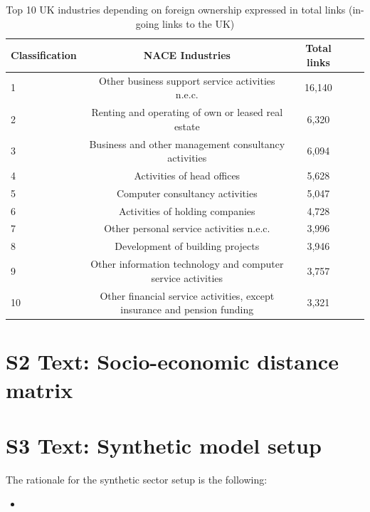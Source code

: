\documentclass[10pt,letterpaper]{article}
\begin{document}
\begin{table}[!ht]
\begin{adjustwidth}{-2.25in}{0in}
\caption{Top 10 UK industries depending on foreign ownership expressed in total links (in-going links to the UK)\label{tab:uk_ingoinglinks}}
\centering
\medskip
\begin{tabular}{|l|c|c|c|c|}
\hline
Classification  & NACE Industries & Total links \\ 
\hline
1 &      Other business support service activities n.e.c. &   16,140  \\
\hline
2 & Renting and operating of own or leased real estate  &  6,320  \\
\hline
3 & Business and other management consultancy activities &  6,094  \\
\hline
4 &  Activities of head offices &   5,628  \\
\hline
5 &  Computer consultancy activities &   5,047  \\
\hline
6 &  Activities of holding companies &  4,728  \\
\hline
7 &  Other personal service activities n.e.c. &  3,996 \\
\hline
8 &  Development of building projects &  3,946 \\
\hline
9 &  Other information technology and computer service activities &  3,757 \\
\hline
10 &  Other financial service activities, except insurance and pension funding  &  3,321 \\
\hline
\end{tabular}
\end{adjustwidth}
\end{table}


\newpage

\section*{S2 Text: Socio-economic distance matrix}


\newpage

\section*{S3 Text: Synthetic model setup}

The rationale for the synthetic sector setup is the following:
\begin{itemize}
    \item 
\end{itemize}
\end{document}
